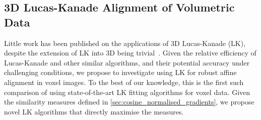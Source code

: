 \subsection{3D Lucas-Kanade Alignment of Volumetric Data}\label{subsec:singl_img_lk_3d}
Little work has been published on the applications of 3D Lucas-Kanade (LK),
despite the extension of LK into 3D being trivial~\cite{RefWorks:75}. Given the
relative efficiency of Lucas-Kanade and other similar algorithms, and their
potential accuracy under challenging conditions, we propose to investigate using
LK for robust affine alignment in voxel images. To the best of our knowledge,
this is the first such comparison of using state-of-the-art LK fitting
algorithms for voxel data. Given the similarity measures defined in
\cref{sec:cosine_normalised_gradients}, we propose novel LK algorithms
that directly maximise the measures.



